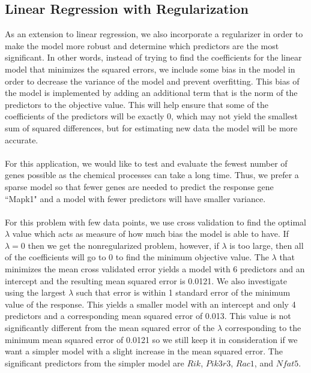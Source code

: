 \documentclass{article}
\begin{document}
\subsection{Linear Regression with Regularization}
As an extension to linear regression, we also incorporate a regularizer in order to make the model more robust and determine which predictors are the most significant.  In other words, instead of trying to find the coefficients for the linear model that minimizes the squared errors, we include some bias in the model in order to decrease the variance of the model and prevent overfitting.  This bias of the model is implemented by adding an additional term that is the norm of the predictors to the objective value. This will help ensure that some of the coefficients of the predictors will be exactly $0$, which may not yield the smallest sum of squared differences, but for estimating new data the model will be more accurate. \\
\null\\
For this application, we would like to test and evaluate the fewest number of genes possible as the chemical processes can take a long time.  Thus, we prefer a sparse model so that fewer genes are needed to predict the response gene ``Mapk1" and a model with fewer predictors will have smaller variance.\\
\null\\
For this problem with few data points, we use cross validation to find the optimal $\lambda$ value which acts as measure of how much bias the model is able to have.  If $\lambda = 0$ then we get the nonregularized problem, however, if $\lambda$ is too large, then all of the coefficients will go to $0$ to find the minimum objective value.  The $\lambda$ that minimizes the mean cross validated error yields a model with 6 predictors and an intercept and the resulting mean squared error is 0.0121.  We also investigate using the largest $\lambda$ such that error is within 1 standard error of the minimum value of the response.  This yields a smaller model with an intercept and only 4 predictors and a corresponding mean squared error of 0.013. This value is not significantly different from the mean squared error of the $\lambda$ corresponding to the minimum mean squared error of 0.0121 so we still keep it in consideration if we want a simpler model with a slight increase in the mean squared error.  The significant predictors from the simpler model are $Rik$, $Pik3r3$, $Rac1$, and $Nfat5$.  \\
\null\\
\end{document}
